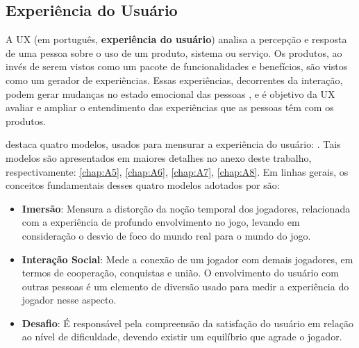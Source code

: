 \pagebreak


\subsection{Experiência do Usuário}
\label{EEUU}

A \ac{UX} (em português, \textbf{experiência do usuário}) analisa a percepção e resposta de uma pessoa sobre o uso de um produto, sistema ou serviço. Os produtos, ao invés de serem vistos como um pacote de funcionalidades e benefícios, são vistos como um gerador de experiências. Essas experiências, decorrentes da interação, podem gerar mudanças no estado emocional das pessoas \cite{calvillo2009core}, e é objetivo da \ac{UX} avaliar e ampliar o entendimento das experiências que as pessoas têm com os produtos.

 destaca quatro modelos, usados para mensurar a experiência do usuário: . Tais modelos são apresentados em maiores detalhes no anexo deste trabalho, respectivamente: \autoref{chap:A5}, \ref{chap:A6}, \ref{chap:A7}, \ref{chap:A8}. Em linhas gerais, os conceitos fundamentais desses quatro modelos adotados por  são: 

\begin{itemize}[label={},leftmargin=2em]
\item \textbf{Imersão}: Mensura a distorção da noção temporal dos jogadores, relacionada com a experiência de profundo envolvimento no jogo, levando em consideração o desvio de foco do mundo real para o mundo do jogo.
\end{itemize}

\begin{itemize}[label={},leftmargin=2em]
\item \textbf{Interação Social}: Mede a conexão de um jogador com demais jogadores, em termos de cooperação, conquistas e união. O envolvimento do usuário com outras pessoas é um elemento de diversão usado para medir a experiência do jogador nesse aspecto. 
\end{itemize}

\begin{itemize}[label={},leftmargin=2em]
\item \textbf{Desafio}: É responsável pela compreensão da satisfação do usuário em relação ao nível de dificuldade, devendo existir um equilíbrio que agrade o jogador.
\end{itemize}

